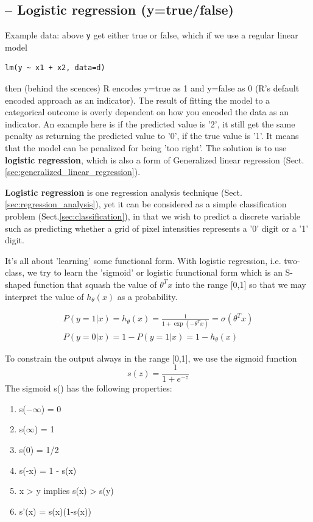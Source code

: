 \subsection{-- Logistic regression (y=true/false)}
\label{sec:logistic_regression}

\begin{mdframed}
Example data: above \verb!y! get either true or false, which if we use a regular
linear model
\begin{verbatim}
lm(y ~ x1 + x2, data=d)
\end{verbatim}
then (behind the scences) R encodes y=true as 1 and y=false as 0 (R's default
encoded approach as an indicator). The result of fitting the model to a
categorical outcome is overly dependent on how you encoded the data as an
indicator. An example here is if the predicted value is '2', it still get the
same penalty as returning the predicted value to '0', if the true value is '1'. 
It means that the model can be penalized for being 'too right'. The solution is
to use {\bf logistic regression}, which is also a form of Generalized linear
regression (Sect.\ref{sec:generalized_linear_regression}).

\end{mdframed}

{\bf Logistic regression} is one regression analysis technique
(Sect.\ref{sec:regression_analysis}), yet it can be considered as a simple
classification problem (Sect.\ref{sec:classification}), in that we  wish to
predict a discrete variable such as predicting whether a grid of pixel
intensities represents a '0' digit or a '1' digit.

It's all about 'learning' some functional form. 
With logistic regression, i.e. two-class, we try to learn the 'sigmoid' or
logistic fuunctional form which is an S-shaped function that squash the value of
$\theta^T x	$ into the range [0,1] so that we may interpret the value of
$h_\theta(x)$ as a probability.

\begin{equation}
\begin{split}
P(y=1 | x) = h_\theta(x) = \frac{1}{1+\exp\left( -\theta^T x \right)} =
\sigma(\theta^T x) \\
P(y=0 | x) = 1 - P(y=1 | x) = 1 - h_\theta(x)
\end{split}
\end{equation}



To constrain the output always in the range [0,1], we use the sigmoid function
\begin{equation}
s(z) = \frac{1}{1+e^{-z}}
\end{equation}
The sigmoid s() has the following properties:
\begin{enumerate}
  \item s($-\infty$) = 0
  \item s($\infty$) = 1
  \item s(0) = 1/2
  \item s(-x) = 1 - s(x)
  \item x > y implies s(x) >  s(y)
  \item s'(x) = s(x)(1-s(x))
\end{enumerate}

